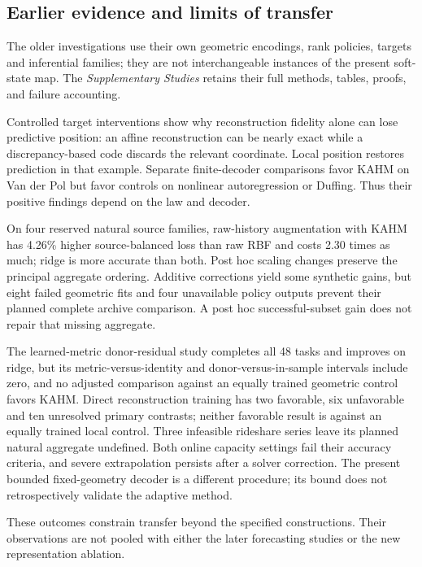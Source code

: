 \subsection{Earlier evidence and limits of transfer}
\label{sec:supporting-evidence}

The older investigations use their own geometric encodings, rank
policies, targets and inferential families; they are not interchangeable
instances of the present soft-state map. The \emph{Supplementary Studies}
retains their full methods, tables, proofs, and failure accounting.

Controlled target interventions show why reconstruction fidelity alone
can lose predictive position: an affine reconstruction can be nearly
exact while a discrepancy-based code discards the relevant coordinate.
Local position restores prediction in that example. Separate finite-decoder
comparisons favor KAHM on Van der Pol but favor controls on nonlinear
autoregression or Duffing. Thus their positive findings depend on the
law and decoder.

On four reserved natural source families, raw-history augmentation with
KAHM has 4.26\% higher source-balanced loss than raw RBF and costs
2.30 times as much; ridge is more accurate than both. Post hoc scaling
changes preserve the principal aggregate ordering. Additive corrections
yield some synthetic gains, but eight failed geometric fits and four
unavailable policy outputs prevent their planned complete archive
comparison. A post hoc successful-subset gain does not repair that
missing aggregate.

The learned-metric donor-residual study completes all 48 tasks and
improves on ridge, but its metric-versus-identity and donor-versus-in-sample
intervals include zero, and no adjusted comparison against an equally
trained geometric control favors KAHM. Direct reconstruction training
has two favorable, six unfavorable and ten unresolved primary contrasts;
neither favorable result is against an equally trained local control.
Three infeasible rideshare series leave its planned natural aggregate
undefined. Both online capacity settings fail their accuracy criteria,
and severe extrapolation persists after a solver correction. The present
bounded fixed-geometry decoder is a different procedure; its bound does
not retrospectively validate the adaptive method.

These outcomes constrain transfer beyond the specified constructions.
Their observations are not pooled with either the later forecasting
studies or the new representation ablation.
